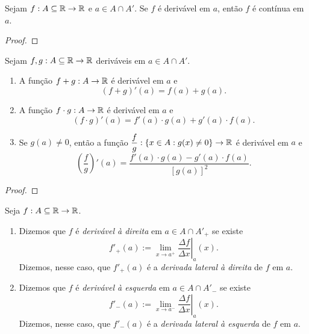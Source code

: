 \begin{theorem}
    Sejam $f : A \subseteq \mathbb{R} \to \mathbb{R}$ e $a \in A \cap A'$. Se $f$ é derivável em $a$, então $f$ é contínua em $a$.
\end{theorem}

\begin{proof}
\end{proof}

\begin{theorem} \label{teo.calc1:algebradasderivadas}
    Sejam $f, g : A \subseteq \mathbb{R} \to \mathbb{R}$ deriváveis em $a \in A \cap A'$.
        \begin{enumerate}[leftmargin=*, align=left, label=\textbf{(\alph*)}]
            \item A função $f + g : A \to \mathbb{R}$ é derivável em $a$ e
                \[
                    (f + g)'(a) = f(a) + g(a).
                \]
            \item A função $f \cdot g : A \to \mathbb{R}$ é derivável em $a$ e
                \[
                    (f \cdot g)'(a) = f'(a) \cdot g(a) + g'(a) \cdot f(a).
                \]
            \item Se $g(a) \neq 0$, então a função $\dfrac{f}{g} : \{x \in A : g(x) \neq 0 \} \to \mathbb{R}$ é derivável em $a$ e
                \[
                    \left( \dfrac{f}{g} \right)'(a) = \dfrac{f'(a) \cdot g(a) - g'(a) \cdot f(a)}{[g(a)]^2}.
                \]
        \end{enumerate}
\end{theorem}

\begin{proof}
    \blackproof
\end{proof}

\begin{definition}
    Seja $f : A \subseteq \mathbb{R} \to \mathbb{R}$.
        \begin{enumerate}[leftmargin=*, align=left, label=\textbf{(\alph*)}]
            \item Dizemos que $f$ é \emph{derivável à direita} em $a \in A \cap A'_+$ se existe
                \[
                    f'_+(a) := \lim_{x \to a^+} \left. \dfrac{\Delta f}{\Delta x} \right|_a (x).
                \]
            Dizemos, nesse caso, que $f'_+(a)$ é a \emph{derivada lateral à direita} de $f$ em $a$.
            \item Dizemos que $f$ é \emph{derivável à esquerda} em $a \in A \cap A'_-$ se existe
                \[
                    f'_-(a) := \lim_{x \to a^-} \left. \dfrac{\Delta f}{\Delta x} \right|_a (x).
                \]
            Dizemos, nesse caso, que $f'_-(a)$ é a \emph{derivada lateral à esquerda} de $f$ em $a$.
        \end{enumerate}
\end{definition}


